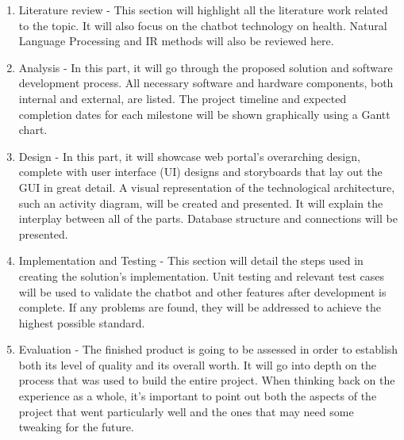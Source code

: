 \begin{enumerate}[label=$\ast$]
	\item Literature review - This section will highlight all the literature work related to the topic. It will also focus on the chatbot technology on health. Natural Language Processing and IR methods will also be reviewed here.
	\item Analysis - In this part, it will go through the proposed solution and software development process. All necessary software and hardware components, both internal and external, are listed. The project timeline and expected completion dates for each milestone will be shown graphically using a Gantt chart.
	\item Design - In this part, it will showcase web portal's overarching design, complete with user interface (UI) designs and storyboards that lay out the GUI in great detail. A visual representation of the technological architecture, such an activity diagram, will be created and presented. It will explain the interplay between all of the parts. Database structure and connections will be presented.
	\item Implementation and Testing - This section will detail the steps used in creating the solution's implementation. Unit testing and relevant test cases will be used to validate the chatbot and other features after development is complete. If any problems are found, they will be addressed to achieve the highest possible standard.
	\item Evaluation - The finished product is going to be assessed in order to establish both its level of quality and its overall worth. It will go into depth on the process that was used to build the entire project. When thinking back on the experience as a whole, it's important to point out both the aspects of the project that went particularly well and the ones that may need some tweaking for the future.
\end{enumerate}

\goodbreak
   


\def\baselinestretch{1.66}
\medskip


